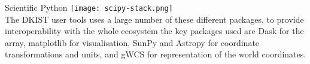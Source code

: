 \documentclass[landscape,a0paper,fontscale=0.32]{baposter}
\begin{document}
\begin{poster}
\begin{posterbox}[name=scipy,column=3,row=0,span=1,below=dataset]{Scientific Python}
  \texttt{[image: scipy-stack.png]}\\[0.1em]

  The DKIST user tools uses a large number of these different packages, to
  provide interoperability with the whole ecosystem the key packages used are Dask
  for the array, matplotlib for visualisation, SunPy and Astropy for coordinate
  transformations and units, and gWCS for representation of the world coordinates.

\end{posterbox}

\end{poster}
\end{document}
